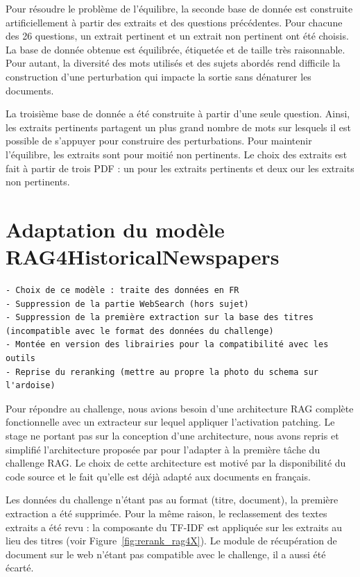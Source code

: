     Pour résoudre le problème de l'équilibre, la seconde base de donnée est construite artificiellement à partir des extraits et des questions précédentes. Pour chacune des 26 questions, un extrait pertinent et un extrait non pertinent ont été choisis. La base de donnée obtenue est équilibrée, étiquetée et de taille très raisonnable. Pour autant, la diversité des mots utilisés et des sujets abordés rend difficile la construction d'une perturbation qui impacte la sortie sans dénaturer les documents.

    La troisième base de donnée a été construite à partir d'une seule question. Ainsi, les extraits pertinents partagent un plus grand nombre de mots sur lesquels il est possible de s'appuyer pour construire des perturbations. Pour maintenir l'équilibre, les extraits sont pour moitié non pertinents. Le choix des extraits est fait à partir de trois PDF : un pour les extraits pertinents et deux our les extraits non pertinents. 
    

\section{Adaptation du modèle RAG4HistoricalNewspapers}
    \begin{verbatim}
- Choix de ce modèle : traite des données en FR
- Suppression de la partie WebSearch (hors sujet)
- Suppression de la première extraction sur la base des titres 
(incompatible avec le format des données du challenge)
- Montée en version des librairies pour la compatibilité avec les outils 
- Reprise du reranking (mettre au propre la photo du schema sur l'ardoise)
    \end{verbatim}

    Pour répondre au challenge, nous avions besoin d'une architecture RAG complète fonctionnelle avec un extracteur sur lequel appliquer l'activation patching. Le stage ne portant pas sur la conception d'une architecture, nous avons repris et simplifié l'architecture proposée par \cite{tran_retrieval_2024} pour l'adapter à la première tâche du challenge RAG. Le choix de cette architecture est motivé par la disponibilité du code source et le fait qu'elle est déjà adapté aux documents en français.

    Les données du challenge n'étant pas au format (titre, document), la première extraction a été supprimée. Pour la même raison, le reclassement des textes extraits a été revu : la composante du TF-IDF est appliquée sur les extraits au lieu des titres (voir Figure~\ref{fig:rerank_rag4X}). Le module de récupération de document sur le web n'étant pas compatible avec le challenge, il a aussi été écarté. 

